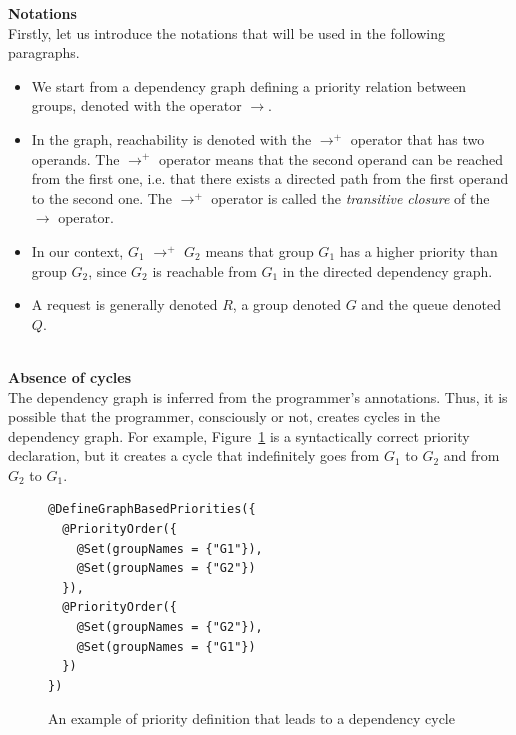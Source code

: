 \documentclass[11pt]{report}
\begin{document}
\textbf{Notations}\\
Firstly, let us introduce the notations that will be used in the following paragraphs. 
\begin{itemize}
\item We start from a dependency graph defining a priority relation between groups, denoted with the operator $\longrightarrow$.
\item In the graph, reachability is denoted with the $\longrightarrow^{+}$ operator that has two operands. The $\longrightarrow^{+}$ operator means that the second operand can be reached from the first one, i.e. that there exists a directed path from the first operand to the second one. The $\longrightarrow^{+}$ operator is called the \emph{transitive closure} of the $\longrightarrow$ operator.
\item In our context, $G_1$ $\longrightarrow^{+}$ $G_2$ means that group $G_1$ has a higher priority than group $G_2$, since $G_2$ is reachable from $G_1$ in the directed dependency graph.
\item A request is generally denoted $R$, a group denoted $G$ and the queue denoted $Q$.
\end{itemize}\\

\textbf{Absence of cycles}\\
The dependency graph is inferred from the programmer's annotations. Thus, it is possible that the programmer, consciously or not, creates cycles in the dependency graph. For example, Figure~\ref{fig:cycle} is a  syntactically correct priority declaration, but it creates a cycle that indefinitely goes from $G_1$ to $G_2$ and from $G_2$ to $G_1$.

\begin{figure}[!ht]
	\lstset{language=java, numbers=left, numberstyle=\tiny, stepnumber=1, numbersep=5pt, basicstyle=\footnotesize}
	\begin{lstlisting}[frame=single]
@DefineGraphBasedPriorities({
  @PriorityOrder({
    @Set(groupNames = {"G1"}),
    @Set(groupNames = {"G2"})
  }),
  @PriorityOrder({
    @Set(groupNames = {"G2"}),
    @Set(groupNames = {"G1"})
  })
})
 	\end{lstlisting}
\caption{An example of priority definition that leads to a dependency cycle}
\label{fig:cycle}
\end{figure}
\end{document}
